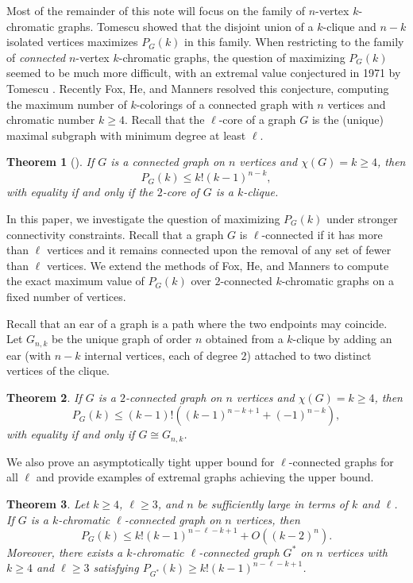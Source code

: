 \documentclass[11pt]{article}
\theoremstyle{plain}
\newtheorem{theorem}{Theorem}[section]
\theoremstyle{definition}
\theoremstyle{remark}
\begin{document}
Most of the remainder of this note will focus on the family of $n$-vertex $k$-chromatic graphs.  Tomescu \cite{ToBook} showed that the disjoint union of a $k$-clique and $n-k$ isolated vertices maximizes $P_{G}(k)$ in this family. When restricting to the family of {\em connected} $n$-vertex $k$-chromatic graphs, the question of maximizing $P_{G}(k)$ seemed to be much more difficult, with an extremal value conjectured in 1971 by Tomescu \cite{To}.  Recently Fox, He, and Manners \cite{FoHeMa} resolved this conjecture, computing the maximum number of $k$-colorings of a connected graph with $n$ vertices and chromatic number $k\ge 4$. Recall that the $\ell$-core of a graph $G$ is the (unique) maximal subgraph with minimum degree at least $\ell$.

\begin{theorem}[\cite{FoHeMa}]\label{thm-FoHeMa}
If $G$ is a connected graph on $n$ vertices and $\chi(G)=k\ge 4$, then
\[
P_G(k) \le k!(k-1)^{n-k},
\]
with equality if and only if the $2$-core of $G$ is a $k$-clique.
\end{theorem}

In this paper, we investigate the question of maximizing $P_G(k)$ under stronger connectivity constraints. Recall that a graph $G$ is $\ell$-connected if it has more than $\ell$ vertices and it remains connected upon the removal of any set of fewer than $\ell$ vertices. We extend the methods of Fox, He, and Manners to compute the exact maximum value of $P_G(k)$ over $2$-connected $k$-chromatic graphs on a fixed number of vertices.

Recall that an ear of a graph is a path where the two endpoints may coincide. Let $G_{n,k}$ be the unique graph of order $n$ obtained from a $k$-clique by adding an ear (with $n-k$ internal vertices, each of degree $2$) attached to two distinct vertices of the clique.

\begin{theorem}\label{thm:2-conn}
If $G$ is a $2$-connected graph on $n$ vertices and $\chi(G)=k\geq 4$, then
\[
P_G(k)\leq (k-1)!((k-1)^{n-k+1}+(-1)^{n-k}),
\]
with equality if and only if $G\cong G_{n,k}$.
\end{theorem}

We also prove an asymptotically tight upper bound for $\ell$-connected graphs for all $\ell$ and provide examples of extremal graphs achieving the upper bound. 

\begin{theorem}\label{thm:l-conn}
Let $k\ge 4$, $\ell \ge 3$, and $n$ be sufficiently large in terms of $k$ and $\ell$. If $G$ is a $k$-chromatic $\ell$-connected graph on $n$ vertices, then
\[P_G(k)\leq k!(k-1)^{n-\ell -k +1}+O((k-2)^n).\]
Moreover, there exists a $k$-chromatic $\ell$-connected graph $G^*$ on $n$ vertices with $k\geq 4$ and $\ell \geq 3$ satisfying  $P_{G^*}(k)\geq k!(k-1)^{n- \ell -k +1}$.
\end{theorem}
\end{document}
